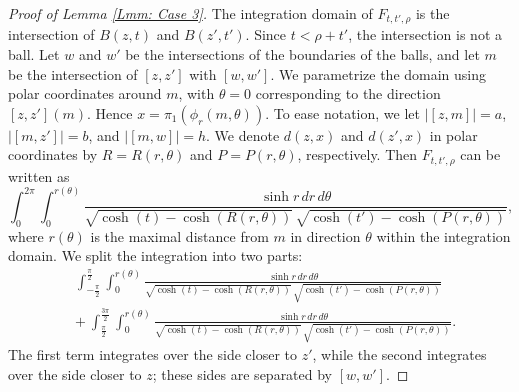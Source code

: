 \documentclass[11pt,twoside,reqno]{amsart} \usepackage{a4wide} \usepackage[T1]{fontenc} \usepackage[utf8]{inputenc} \usepackage{soul}  \usepackage{amsmath} \usepackage{amsfonts} \usepackage{amssymb} \usepackage{mathtools} \usepackage{amsthm} \usepackage{xcolor} \usepackage{graphicx} \usepackage{hyperref} \usepackage{standalone} \usepackage{esint} \usepackage{comment} \usepackage[left=2.3cm,top=3cm,right=2.3cm]{geometry} \usepackage{bm} \usepackage{svg} \usepackage{float} \numberwithin{equation}{section} \theoremstyle{plain} \newtheorem{thm}{Theorem}[section] \newtheorem{theorem}[thm]{Theorem} \newtheorem*{theorem*}{Theorem}\newtheorem{conj}[thm]{Conjecture} \newtheorem{lemma}[thm]{Lemma} \newtheorem{prop}[thm]{Proposition} \newtheorem{proposition}[thm]{Proposition} \newtheorem{cor}[thm]{Corollary} \newtheorem{question}[thm]{Question} \newtheorem{corollary}[thm]{Corollary} \newtheorem{assumption}[thm]{Assumption} \theoremstyle{definition} \newtheorem{defn}[thm]{Definition} \newtheorem{choice}[thm]{Choice} \newtheorem{definition}[thm]{Definition} \newtheorem{ex}[thm]{Example} \newtheorem{notation}[thm]{Notation} \newtheorem*{ack}{Acknowledgements} \theoremstyle{remark} \newtheorem{remark}[thm]{Remark} \newtheorem{bigremark}[thm]{Remark} \usepackage{xcolor} \newcommand{\red}[1]{ {\color{Red}#1} } \newcommand{\blue}[1]{ {\color{Blue}#1} } \author{Kai Hippi} \address{Aalto University, Espoo, Finland} \email{kai.hippi@aalto.fi}
\begin{document}
\begin{proof}[Proof of Lemma \ref{Lmm: Case 3}]

	The integration domain of $ F_{t,t',\rho} $ is the intersection of $B(z,t)$ and $B(z',t')$. Since $t < \rho+t'$, the intersection is not a ball. Let $w$ and $w'$ be the intersections of the boundaries of the balls, and let $m$ be the intersection of $[z,z']$ with $[w,w']$. We parametrize the domain using polar coordinates around $m$, with $\theta=0$ corresponding to the direction $[z,z']( m )$. Hence $ x = \pi_{1}( \phi_{r}( m, \theta ) ) $. To ease notation, we let $ | [z,m] | = a $, $ | [m,z'] | = b $, and $ | [m,w] | = h $. We denote $ d( z,x ) $ and $ d( z',x ) $ in polar coordinates by $ R = R( r,\theta ) $ and $ P = P( r,\theta ) $, respectively. Then $ F_{t,t',\rho} $ can be written as
$$
\int_0^{2\pi} \int_0^{r(\theta)} \frac{\sinh r \, dr \, d\theta}{\sqrt{\cosh(t)-\cosh(R(r,\theta))} \, \sqrt{\cosh(t')-\cosh(P(r,\theta))}},
$$
where $ r( \theta ) $ is the maximal distance from $ m $ in direction $ \theta $ within the integration domain. We split the integration into two parts:
\begin{align}
	&
	\nonumber
	\int_{-\frac{\pi}{2}}^{\frac{\pi}{2}} \int_0^{r(\theta)} \frac{\sinh r \, dr \, d\theta}{\sqrt{\cosh(t)-\cosh(R(r,\theta))} \, \sqrt{\cosh(t')-\cosh(P(r,\theta))}} 
	\\
	& + \
	\label{Expr: Side splitting}
	\int_{\frac{\pi}{2}}^{\frac{3\pi}{2}} \int_0^{r(\theta)} \frac{\sinh r \, dr \, d\theta}{\sqrt{\cosh(t)-\cosh(R(r,\theta))} \, \sqrt{\cosh(t')-\cosh(P(r,\theta))}}.
\end{align}
The first term integrates over the side closer to $ z' $, while the second integrates over the side closer to $ z $; these sides are separated by $ [w,w'] $.


\end{proof}
\end{document}
